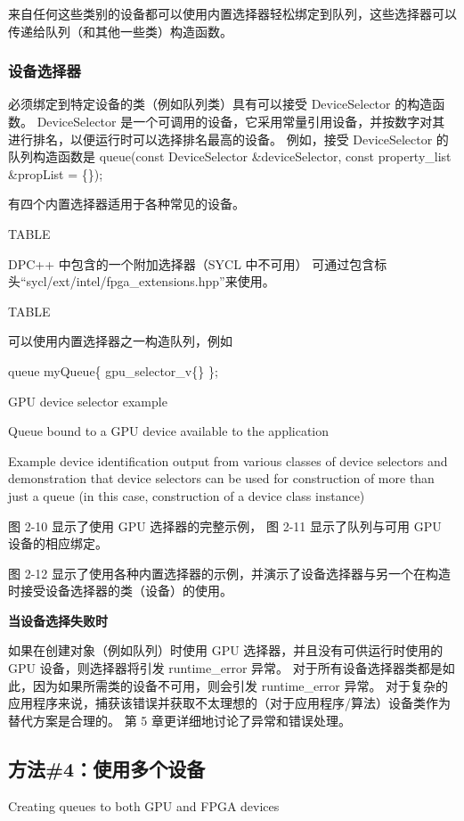 来自任何这些类别的设备都可以使用内置选择器轻松绑定到队列，这些选择器可以传递给队列（和其他一些类）构造函数。

\subsubsection{设备选择器}
必须绑定到特定设备的类（例如队列类）具有可以接受 DeviceSelector 的构造函数。 
DeviceSelector 是一个可调用的设备，它采用常量引用设备，并按数字对其进行排名，以便运行时可以选择排名最高的设备。 
例如，接受 DeviceSelector 的队列构造函数是
queue(const DeviceSelector \&deviceSelector, const property\_list \&propList = \{\});

有四个内置选择器适用于各种常见的设备。

{\color{blue} TABLE }

DPC++ 中包含的一个附加选择器（SYCL 中不可用）
可通过包含标头“sycl/ext/intel/fpga\_extensions.hpp”来使用。

{\color{blue} TABLE }

可以使用内置选择器之一构造队列，例如

queue myQueue\{ gpu\_selector\_v\{\} \}; 

{\color{red} GPU device selector example }

{\color{red} Queue bound to a GPU device available to the application }

{\color{red} Example device identification output from various classes of device selectors and demonstration that device selectors can be used for construction of more than just a queue (in this case, construction of a device class instance) }

图 2-10 显示了使用 GPU 选择器的完整示例，
图 2-11 显示了队列与可用 GPU 设备的相应绑定。

图 2-12 显示了使用各种内置选择器的示例，并演示了设备选择器与另一个在构造时接受设备选择器的类（设备）的使用。

\textbf{当设备选择失败时}

如果在创建对象（例如队列）时使用 GPU 选择器，并且没有可供运行时使用的 GPU 设备，则选择器将引发 runtime\_error 异常。 
对于所有设备选择器类都是如此，因为如果所需类的设备不可用，则会引发 runtime\_error 异常。 
对于复杂的应用程序来说，捕获该错误并获取不太理想的（对于应用程序/算法）设备类作为替代方案是合理的。 
第 5 章更详细地讨论了异常和错误处理。

\subsection{方法\#4：使用多个设备}
{\color{red} Creating queues to both GPU and FPGA devices }

